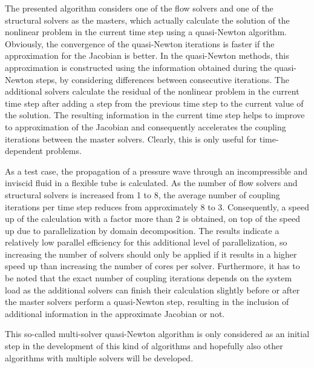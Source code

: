 \documentclass{report}
\begin{document}
The presented algorithm considers one of the flow solvers and one of the
structural solvers as the masters, which actually calculate the solution
of the nonlinear problem in the current time step using a quasi-Newton
algorithm. Obviously, the convergence of the quasi-Newton iterations is
faster if the approximation for the Jacobian is better. In the
quasi-Newton methods, this approximation is constructed using the
information obtained during the quasi-Newton steps, by considering
differences between consecutive iterations. The additional solvers
calculate the residual of the nonlinear problem in the current time step
after adding a step from the previous time step to the current value of
the solution. The resulting information in the current time step helps to
improve to approximation of the Jacobian and consequently accelerates the
coupling iterations between the master solvers. Clearly, this is only
useful for time-dependent problems.

As a test case, the propagation of a pressure wave through an
incompressible and inviscid fluid in a flexible tube is calculated. As
the number of flow solvers and structural solvers is increased from 1 to
8, the average number of coupling iterations per time step reduces from
approximately 8 to 3. Consequently, a speed up of the calculation with a
factor more than 2 is obtained, on top of the speed up due to
parallelization by domain decomposition. The results indicate a
relatively low parallel efficiency for this additional level of
parallelization, so increasing the number of solvers should only be
applied if it results in a higher speed up than increasing the number of
cores per solver. Furthermore, it has to be noted that the exact number
of coupling iterations depends on the system load as the additional
solvers can finish their calculation slightly before or after the master
solvers perform a quasi-Newton step, resulting in the inclusion of
additional information in the approximate Jacobian or not.

This so-called multi-solver quasi-Newton algorithm is only considered as
an initial step in the development of this kind of algorithms and
hopefully also other algorithms with multiple solvers will be developed.
\end{document}
